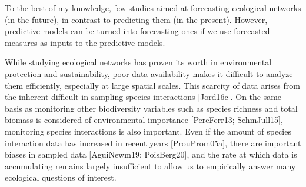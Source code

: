 To the best of my knowledge, few studies aimed at forecasting ecological
networks (in the future), in contrast to predicting them (in the present).
However, predictive models can be turned into forecasting ones if we use
forecasted measures as inputs to the predictive models.

While studying ecological networks has proven its worth in environmental
protection and sustainability, poor data availability makes it difficult to
analyze them efficiently, especially at large spatial scales. This scarcity of
data arises from the inherent difficult in sampling species interactions
[Jord16c]. On the same basis as monitoring other biodiversity variables such as
species richness and total biomass is considered of environmental importance
[PereFerr13; SchmJull15], monitoring species interactions is also important.
Even if the amount of species interaction data has increased in recent years
[ProuProm05a], there are important biases in sampled data [AguiNewm19;
PoisBerg20], and the rate at which data is accumulating remains largely
insufficient to allow us to empirically answer many ecological questions of
interest.

